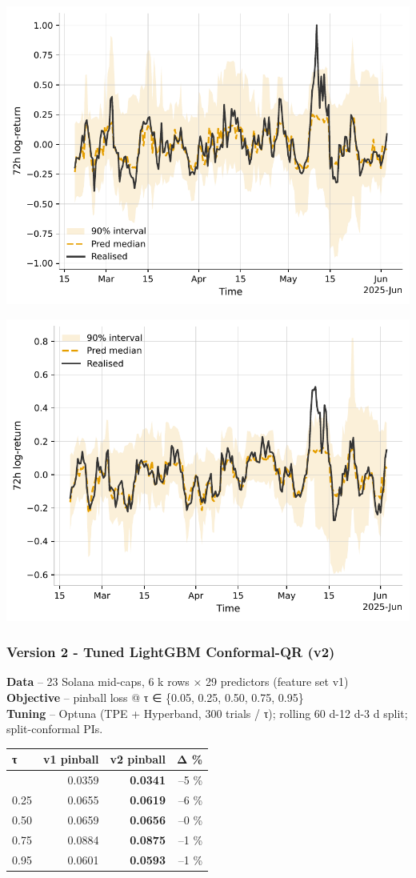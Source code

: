 \documentclass[
  a4paper,
  DIV=11,
  numbers=noendperiod]{scrreprt}
\begin{document}
\begin{center}
\includegraphics[width=0.72\linewidth,height=\textheight,keepaspectratio]{appendices/figures/final/fig-v1-lgbm-cqr-fan-retardio.pdf}
\end{center}
\begin{center}
\includegraphics[width=0.72\linewidth,height=\textheight,keepaspectratio]{appendices/figures/final/fig-v1-lgbm-cqr-fan-bome.pdf}
\end{center}

\subsubsection{Version 2 - Tuned LightGBM Conformal-QR
(v2)}\label{version-2---tuned-lightgbm-conformal-qr-v2}

\textbf{Data} -- 23 Solana mid-caps, 6 k rows × 29 predictors (feature
set v1)\\
\textbf{Objective} -- pinball loss @ τ ∈ \{0.05, 0.25, 0.50, 0.75,
0.95\}\\
\textbf{Tuning} -- Optuna (TPE + Hyperband, 300 trials / τ); rolling 60
d-12 d-3 d split; split-conformal PIs.

\begin{longtable}[]{@{}lrrr@{}}
\toprule\noalign{}
τ & v1 pinball & \textbf{v2 pinball} & Δ \% \\
\midrule\noalign{}
\endhead
\bottomrule\noalign{}
\endlastfoot
0.05 & 0.0359 & \textbf{0.0341} & --5 \% \\
0.25 & 0.0655 & \textbf{0.0619} & --6 \% \\
0.50 & 0.0659 & \textbf{0.0656} & --0 \% \\
0.75 & 0.0884 & \textbf{0.0875} & --1 \% \\
0.95 & 0.0601 & \textbf{0.0593} & --1 \% \\
\end{longtable}
\end{document}

